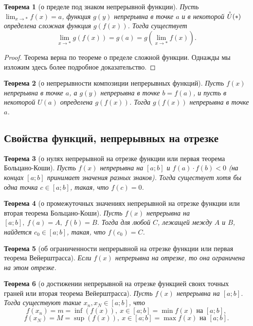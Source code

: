 \documentclass[a4paper,12pt]{article} %
\newtheorem{theorem}{Теорема}[section]
\theoremstyle{remark}
\theoremstyle{definition}
\begin{document}
\begin{theorem}[о пределе под знаком непрерывной функции]
    Пусть $\displaystyle \lim_{x \to *} f(x) = a$, функция $g(y)$ непрерывна в точке $a$ и в некоторой $\accentset{\circ}{U}(*)$ определена сложная функция $g(f(x))$. Тогда существует
    \[\lim_{x \to *} g(f(x)) = g(a) = g(\lim_{x \to *} f(x)).\]
\end{theorem}
\begin{proof}
    Теорема верна по теореме о пределе сложной функции. Однажды мы изложим здесь более подробное доказательство.
\end{proof}

\begin{theorem}[о непрерывности композиции непрерывных функций]
    Пусть $f(x)$ непрерывна в точке $a$, а $g(y)$ непрерывна в точке $b = f(a)$, и пусть в некоторой $U(a)$ определена $g(f(x))$.
    Тогда $g(f(x))$ непрерывна в точке $a$.
\end{theorem}

\subsection{Свойства функций, непрерывных на отрезке}
\begin{theorem}[о нулях непрерывной на отрезке функции или первая теорема Больцано-Коши]
    Пусть $f(x)$ непрерывна на $[a; b]$ и $f(a)\cdot f(b) < 0$ (на концах $[a; b]$ принимает значения разных знаков).
    Тогда существует хотя бы одна точка $c\in [a; b]$, такая, что $f(c) = 0$.
\end{theorem}

\begin{theorem}[о промежуточных значениях непрерывной на отрезке функции или вторая теорема Больцано-Коши]
    Пусть $f(x)$ непрерывна на $[a; b], \ f(a) = A, \ f(b) = B$. Тогда для любой $C$, лежащей между $A$ и $B$, найдется $c_0 \in [a; b]$, такая, что $f(c_0) = C$.
\end{theorem}

\begin{theorem}[об ограниченности непрерывной на отрезке функции или первая теорема Вейерштрасса]
    Если $f(x)$ непрерывна на отрезке, то она ограничена на этом отрезке. 
\end{theorem}

\begin{theorem}[о достижении непрерывной на отрезке функцией своих точных граней или вторая теорема Вейерштрасса]
    Пусть $f(x)$ непрерывна на $[a; b]$. Тогда существуют такие $x_{n}, x_N \in [a; b]$, что
    \[ f(x_{n}) = m = \inf(f(x)), \ x\in [a; b] = \min f(x) \text{ на } [a; b] ,\] 
    \[ f(x_{N}) = M = \sup(f(x)), \ x\in [a; b] = \max f(x) \text{ на } [a; b] .\] 
\end{theorem}
\end{document}
